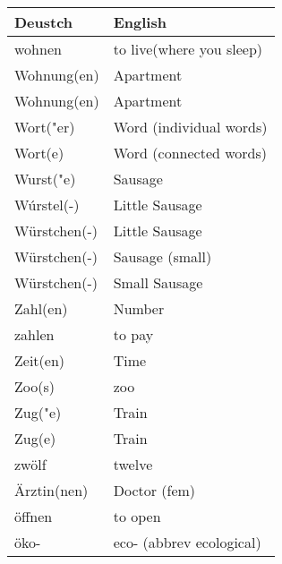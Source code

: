 \documentclass{article}
\renewcommand{\arraystretch}{1}
\begin{document}
\newpage

\begin{minipage}{0.48\textwidth}
    \centering
    \renewcommand{\arraystretch}{1.5}
    \begin{tabular}{|>{\raggedright\arraybackslash}p{3.5cm}|>{\raggedright\arraybackslash}p{3.5cm}|}
        \hline
        \rowcolor{gray!20} \textbf{Deustch} & \textbf{English} \\
        \hline
        wohnen & to live(where you sleep) \\\hline
        Wohnung(en) & Apartment \\\hline
        Wohnung(en) & Apartment \\\hline
        Wort("er) & Word (individual words) \\\hline
        Wort(e) & Word (connected words) \\\hline
        Wurst("e) & Sausage \\\hline
        Wúrstel(-) & Little Sausage \\\hline
        Würstchen(-) & Little Sausage \\\hline
        Würstchen(-) & Sausage (small) \\\hline
        Würstchen(-) & Small Sausage \\\hline
        Zahl(en) & Number \\\hline
        zahlen & to pay \\\hline
        Zeit(en) & Time \\\hline
        Zoo(s) &  zoo \\\hline
        Zug("e) & Train \\\hline
        Zug(e) & Train \\\hline
        zwölf & twelve \\\hline
        Ärztin(nen) & Doctor (fem) \\\hline
        öffnen & to open \\\hline
        öko- & eco- (abbrev ecological) \\\hline
    \end{tabular}
\end{minipage}%
\end{document}
